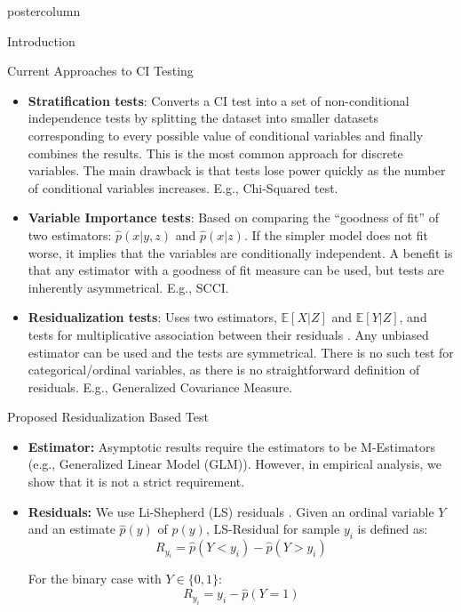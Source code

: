 \documentclass{beamer}
\begin{document}
\begin{frame}
\begin{columns}
\begin{column}{.33\textwidth}
\begin{beamercolorbox}[center]{postercolumn}
\begin{minipage}{.98\textwidth}
{\begin{myblock}{Introduction}
	\end{myblock}\vfill
	\begin{myblock}{Current Approaches to CI Testing}
		\begin{itemize}
			\item \textbf{Stratification tests}: Converts a CI
				test into a set of non-conditional independence
				tests by splitting the dataset into smaller
				datasets corresponding to every possible value
				of conditional variables and finally combines
				the results. This is the most common approach
				for discrete variables. The main drawback is
				that tests lose power quickly as the number
				of conditional variables increases. E.g.,
				Chi-Squared test.
			\item \textbf{Variable Importance tests}: Based
				on comparing the ``goodness of fit'' of two
				estimators: $ \hat{p}(x | y, z) $ and $
				\hat{p}(x|z) $. If the simpler model does not
				fit worse, it implies that the variables are
				conditionally independent. A benefit is that
				any estimator with a goodness of fit measure
				can be used, but tests are inherently
				asymmetrical. E.g., SCCI.
			\item \textbf{Residualization tests}: Uses two
				estimators, $ \mathbb{E}[X | Z] $ and $
				\mathbb{E}[Y|Z] $, and tests for multiplicative
				association between their residuals
				\cite{Daudin1980}. Any unbiased estimator can
				be used and the tests are symmetrical. There is
				no such test for categorical/ordinal variables,
				as there is no straightforward definition of
				residuals. E.g., Generalized Covariance
				Measure.
		\end{itemize}
	\end{myblock}\vfill
	\begin{myblock}{Proposed Residualization Based Test}
		\begin{itemize}
			\item \textbf{Estimator:} Asymptotic results require
				the estimators to be M-Estimators (e.g.,
				Generalized Linear Model (GLM)). However, in
				empirical analysis, we show that it is not a
				strict requirement.
			\item \textbf{Residuals:} We use Li-Shepherd (LS) residuals \cite{li2012}.
				Given an ordinal variable $ Y $ and an estimate $ \hat{p}(y) $ of $
				p(y) $, LS-Residual for sample $ y_i $ is defined as:
				$$ R_{y_i} = \hat{p}(Y < y_i) - \hat{p}(Y > y_i) $$

				For the binary case with $ Y \in \{0, 1\} $:
				$$ R_{y_i} = y_i - \hat{p}(Y = 1) $$


\end{itemize}
\end{myblock}}
\end{minipage}
\end{beamercolorbox}
\end{column}
\end{columns}
\end{frame}
\end{document}
